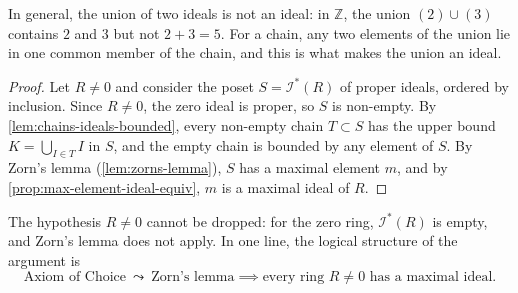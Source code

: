 \begin{beyond}
In general, the union of two ideals is not an ideal: in $\mathbb{Z}$, the union $(2) \cup (3)$ contains $2$ and $3$ but not $2 + 3 = 5$. For a chain, any two elements of the union lie in one common member of the chain, and this is what makes the union an ideal.
\end{beyond}


\begin{proof}
Let $R \neq 0$ and consider the poset $S = \mathscr{I}^*(R)$ of proper ideals, ordered by inclusion. Since $R \neq 0$, the zero ideal is proper, so $S$ is non-empty. By \cref{lem:chains-ideals-bounded}, every non-empty chain $T \subset S$ has the upper bound $K = \bigcup_{I \in T} I$ in $S$, and the empty chain is bounded by any element of $S$. By Zorn's lemma (\cref{lem:zorns-lemma}), $S$ has a maximal element $m$, and by \cref{prop:max-element-ideal-equiv}, $m$ is a maximal ideal of $R$.
\end{proof}

The hypothesis $R \neq 0$ cannot be dropped: for the zero ring, $\mathscr{I}^*(R)$ is empty, and Zorn's lemma does not apply. In one line, the logical structure of the argument is
\[
\text{Axiom of Choice} \ \leadsto\ \text{Zorn's lemma} \implies \text{every ring } R \neq 0 \text{ has a maximal ideal}.
\]


